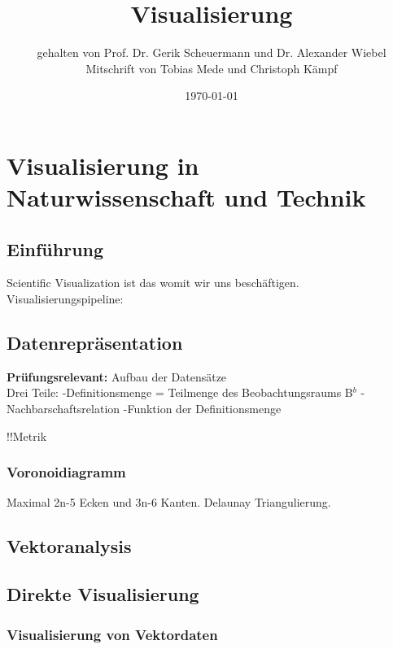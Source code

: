 \documentclass[12pt,a4paper,oneside,normalheadings,abstracton,liststotoc,bibtotoc,titlepage,pdftex]{scrbook}
\begin{document}

\titlehead{Universität Leipzig\\Fakultät für Fakultät für Mathematik und Informatik}
\subject{Vorlesungsmitschrift WiSe 2010}
\title{Visualisierung}
\author{gehalten von Prof. Dr. Gerik Scheuermann und Dr. Alexander Wiebel\\
Mitschrift von Tobias Mede und Christoph Kämpf}
\date{\today}

\maketitle[1]


\tableofcontents
\pagebreak


\chapter{Visualisierung in Naturwissenschaft und Technik}

\section{Einführung}
Scientific Visualization ist das womit wir uns beschäftigen.
Visualisierungspipeline:


\section{Datenrepräsentation}
\textbf{Prüfungsrelevant:} Aufbau der Datensätze\\
Drei Teile:
-Definitionsmenge = Teilmenge des Beobachtungsraums B$^b$
-Nachbarschaftsrelation
-Funktion der Definitionsmenge

!!Metrik
\subsection{Voronoidiagramm}
Maximal 2n-5 Ecken und 3n-6 Kanten. Delaunay Triangulierung.

\section{Vektoranalysis}

\section{Direkte Visualisierung}
\subsection{Visualisierung von Vektordaten}
\end{document}
